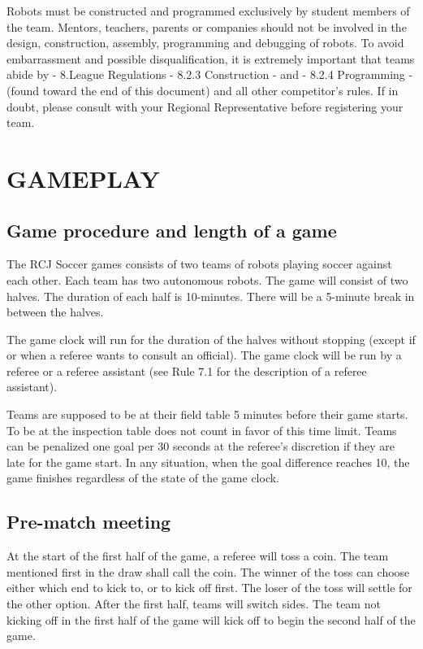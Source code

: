 \documentclass{article}
\begin{document}
Robots must be constructed and programmed exclusively by student members of the
team. Mentors, teachers, parents or companies should not be involved in the
design, construction, assembly, programming and debugging of robots. To avoid
embarrassment and possible disqualification, it is extremely important that
teams abide by - 8.League Regulations - 8.2.3 Construction - and - 8.2.4
Programming - (found toward the end of this document) and all other
competitor's rules. If in doubt, please consult with your Regional
Representative before registering your team.

\newpage

\tableofcontents

\newpage

\section{GAMEPLAY \label{ref-001}}

\subsection{Game procedure and length of a game \label{ref-002}}

The RCJ Soccer games consists of two teams of robots playing soccer against
each other. Each team has two autonomous robots. The game will consist of two
halves. The duration of each half is 10-minutes. There will be a 5-minute break
in between the halves.

The game clock will run for the duration of the halves without stopping (except
if or when a referee wants to consult an official). The game clock will be run
by a referee or a referee assistant (see Rule 7.1 for the description of a
referee assistant).

Teams are supposed to be at their field table 5 minutes before their game
starts. To be at the inspection table does not count in favor of this time
limit. Teams can be penalized one goal per 30 seconds at the referee's
discretion if they are late for the game start. In any situation, when the goal
difference reaches 10, the game finishes regardless of the state of the game
clock.

\subsection{Pre-match meeting \label{ref-003}}

At the start of the first half of the game, a referee will toss a coin. The
team mentioned first in the draw shall call the coin. The winner of the toss
can choose either which end to kick to, or to kick off first. The loser of the
toss will settle for the other option. After the first half, teams will switch
sides. The team not kicking off in the first half of the game will kick off to
begin the second half of the game.
\end{document}
